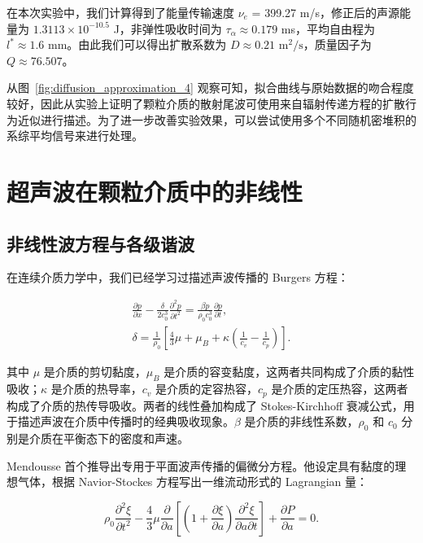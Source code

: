   在本次实验中，我们计算得到了能量传输速度 $\nu_{e}$ = 399.27 \unit{\meter}/\unit{\second}，修正后的声源能量为 $1.3113\times 10^{-10.5}$ \unit{J}，非弹性吸收时间为 $\tau_{\alpha}\approx 0.179$ \unit{\milli\second}，平均自由程为 $l^{*}\approx 1.6$ \unit{\milli\meter}。由此我们可以得出扩散系数为 $D\approx 0.21$ $\unit{\meter}^{2}/\unit{\second}$，质量因子为 $Q\approx 76.507$。

  从图~\ref{fig:diffusion_approximation_4} 观察可知，拟合曲线与原始数据的吻合程度较好，因此从实验上证明了颗粒介质的散射尾波可使用来自辐射传递方程的扩散行为近似进行描述。为了进一步改善实验效果，可以尝试使用多个不同随机密堆积的系综平均信号来进行处理。

\section{超声波在颗粒介质中的非线性}

\subsection{非线性波方程与各级谐波}

在连续介质力学中，我们已经学习过描述声波传播的 Burgers 方程：

\begin{align}
  \frac{\partial p}{\partial x} - \frac{\delta}{2c_{0}^{3}}\frac{\partial^{2}p}{\partial t^{2}} = \frac{\beta p}{\rho_{0}c_{0}^{3}}\frac{\partial p}{\partial t},\label{eq:burgers_equation_1}\\
  \delta = \frac{1}{\rho_{0}}\left[\frac{4}{3}\mu + \mu_{B} + \kappa\left(\frac{1}{c_{v}} - \frac{1}{c_{p}}\right)\right].
\end{align}

其中 $\mu$ 是介质的剪切黏度，$\mu_{B}$ 是介质的容变黏度，这两者共同构成了介质的黏性吸收；$\kappa$ 是介质的热导率，$c_{v}$ 是介质的定容热容，$c_{p}$ 是介质的定压热容，这两者构成了介质的热传导吸收。两者的线性叠加构成了 Stokes-Kirchhoff 衰减公式，用于描述声波在介质中传播时的经典吸收现象。$\beta$ 是介质的非线性系数，$\rho_{0}$ 和 $c_{0}$ 分别是介质在平衡态下的密度和声速。

Mendousse 首个推导出专用于平面波声传播的偏微分方程。他设定具有黏度的理想气体，根据 Navior-Stockes 方程写出一维流动形式的 Lagrangian 量\cite{hamilton_nonlinear_1998}：

\begin{equation}
  \rho_{0}\frac{\partial^{2}\xi}{\partial t^{2}} - \frac{4}{3}\mu\frac{\partial }{\partial a}\left[\left(1 + \frac{\partial\xi}{\partial a}\right)\frac{\partial^{2}\xi}{\partial a\partial t}\right] + \frac{\partial P}{\partial a} = 0.\label{eq:mendousse_equation}
\end{equation}


